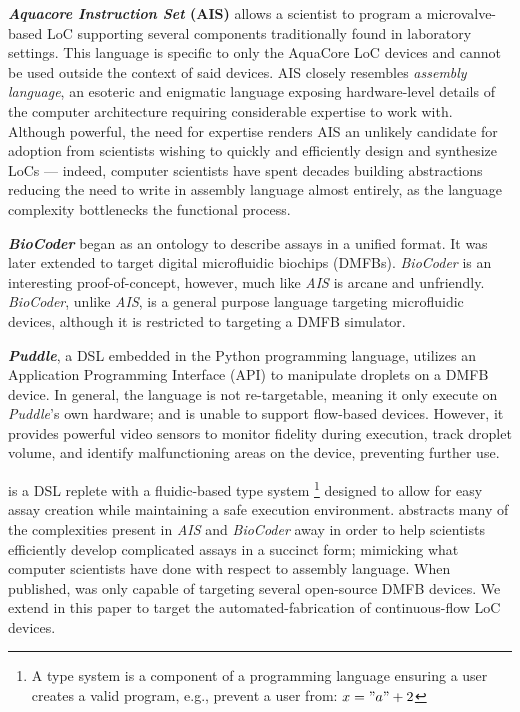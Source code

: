 \textbf{\textit{Aquacore Instruction Set} (AIS)}\cite{amin_isca07, amin13} allows a scientist to program a microvalve-based LoC supporting several components traditionally found in laboratory settings.
This language is specific to only the AquaCore LoC devices and cannot be used outside the context of said devices.
AIS closely resembles \textit{assembly language}, an esoteric and enigmatic language exposing hardware-level details of the computer architecture requiring considerable expertise to work with.
Although powerful, the need for expertise renders AIS an unlikely candidate for adoption from scientists wishing to quickly and efficiently design and synthesize LoCs --- indeed, computer scientists have spent decades building abstractions reducing the need to write in assembly language almost entirely, as the language complexity bottlenecks the functional process.

\textbf{\textit{BioCoder}} began as an ontology \cite{Thies_BioCoder} to describe assays in a unified format.
It was later extended to target digital microfluidic biochips\cite{McDaniel2013, Grissom_JetC, CURTIS_BIOCODER, curtis2018compiler} (DMFBs).
\textit{BioCoder} is an interesting proof-of-concept, however, much like \textit{AIS} is arcane and unfriendly.
\textit{BioCoder}, unlike \textit{AIS}, is a general purpose language targeting microfluidic devices, although it is restricted to targeting a DMFB simulator\cite{grissom2015open}.

\textbf{\textit{Puddle}}\cite{willsey2019puddle}, a DSL embedded in the Python programming language, utilizes an Application Programming Interface (API) to manipulate droplets on a DMFB device.
In general, the language is not re-targetable, meaning it only execute on \textit{Puddle}'s own hardware; and is unable to support flow-based devices.
However, it provides powerful video sensors to monitor fidelity during execution, track droplet volume, and identify malfunctioning areas on the device, preventing further use.

\textbf{\textit{\bs{}}}\cite{ott2018bioscript} is a DSL replete with a fluidic-based type system
\footnote{A type system is a component of a programming language ensuring a user creates a valid program, e.g., prevent a user from: $x="a" + 2$} 
designed to allow for easy assay creation while maintaining a safe execution environment.
\textit{\bs{}} abstracts many of the complexities present in \textit{AIS} and \textit{BioCoder} away in order to help scientists efficiently develop complicated assays in a succinct form; mimicking what computer scientists have done with respect to assembly language. When published, \bs{} was only capable of targeting several open-source DMFB devices. We extend \bs{} in this paper to target the automated-fabrication of continuous-flow LoC devices.

